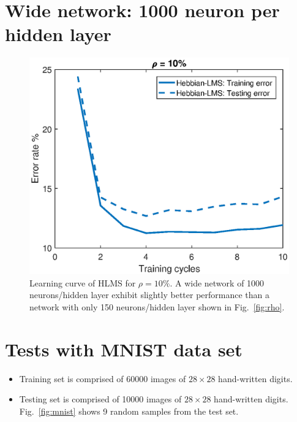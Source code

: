 \documentclass[a4paper, 10pt]{article}
\begin{document}
\section*{Wide network: 1000 neuron per hidden layer}

\FloatBarrier
\begin{figure}[h!]
	\centering
	\includegraphics[width=\textwidth]{figs/wide_net.eps}
	\caption{Learning curve of HLMS for $\rho = 10\%$. A wide network of 1000 neurons/hidden layer exhibit slightly better performance than a network with only 150 neurons/hidden layer shown in Fig.~\ref{fig:rho}.} \label{fig:wide}
\end{figure}
\FloatBarrier

\newpage
\section*{Tests with MNIST data set}

\begin{itemize}
 	\item Training set is comprised of 60000 images of $28 \times 28$ hand-written digits.
 	\item Testing set is comprised of 10000 images of $28 \times 28$ hand-written digits. Fig.~\ref{fig:mnist} shows 9 random samples from the test set.
\end{itemize}
\end{document}
